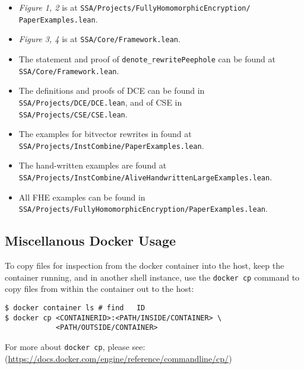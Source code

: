 \documentclass{sigplanconf}
\begin{document}
\begin{itemize}
\item \emph{Figure 1, 2} is at \texttt{SSA/Projects/FullyHomomorphicEncryption/\\PaperExamples.lean}.
\item \emph{Figure 3, 4} is at \texttt{SSA/Core/Framework.lean}.
\item The statement and proof of \texttt{denote\_rewritePeephole} can be found at 
\texttt{SSA/Core/Framework.lean}. 
\item The definitions and proofs of DCE can be found in \\
\texttt{SSA/Projects/DCE/DCE.lean}, and of CSE in \\\texttt{SSA/Projects/CSE/CSE.lean}.
\item The examples for bitvector rewrites in found at \\\texttt{SSA/Projects/InstCombine/PaperExamples.lean}.
\item The hand-written examples are found at \\\texttt{SSA/Projects/InstCombine/AliveHandwrittenLargeExamples.lean}.
\item All FHE examples can be found in \\\texttt{SSA/Projects/FullyHomomorphicEncryption/PaperExamples.lean}.
\end{itemize}

\subsection{Miscellanous Docker Usage}

To copy files for inspection from the docker container into the host,
 keep the container running, and in another
shell instance, use the \texttt{docker cp}
command to copy files from within the container out to the host:

\begin{verbatim}
$ docker container ls # find   ID
$ docker cp <CONTAINERID>:<PATH/INSIDE/CONTAINER> \
            <PATH/OUTSIDE/CONTAINER>
\end{verbatim}
For more about \texttt{docker cp}, please see:
(\url{https://docs.docker.com/engine/reference/commandline/cp/})





\end{document}
